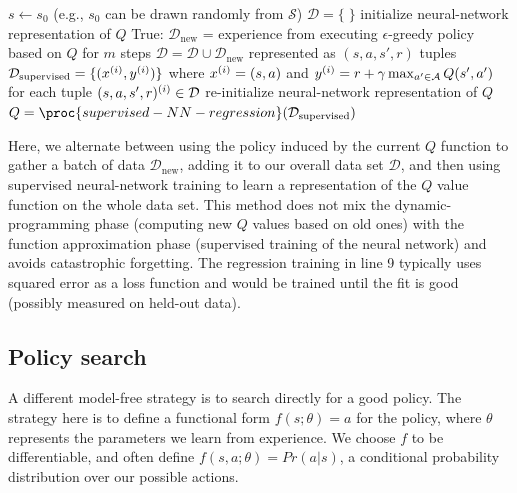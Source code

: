 \begin{codebox}
  \li $s \gets s_0$ \Comment (e.g., $s_0$ can be drawn randomly from $\mathcal{S}$)
  \li $\mathcal{D} = \{\;\}$
  \li initialize neural-network representation of $Q$
  \li \While True: \Do
  \li  $\mathcal{D}_\text{new}$ = experience from executing $\epsilon$-greedy policy based
  on $Q$ for $m$ steps
  \li $\mathcal{D} = \mathcal{D} \cup \mathcal{D}_\text{new}$ represented
  as $(s, a, s', r)$ tuples
  \li $\mathcal{D}_\text{supervised} = \{(x^{(i)}, y^{(i)})\}$  where $x^{(i)} =
    (s, a)$ and $y^{(i)} = r + \gamma \max_{a' \in \mathcal{A}} Q(s', a')$
  \li \;\;\;for each tuple $(s, a, s', r)^{(i)} \in \mathcal{D}$
  \li re-initialize neural-network representation of $Q$
  \li $Q = \proc{supervised-NN-regression}(\mathcal{D}_\text{supervised})$
  \End
\end{codebox}

Here, we alternate between using the policy induced by the current $Q$
function to gather a batch of data $\mathcal{D}_\text{new}$, adding it
to our overall data set $\mathcal{D}$, and then using supervised
neural-network training to learn a representation of the $Q$ value
function on the whole data set.  This method does not mix the
dynamic-programming phase (computing new $Q$ values based on old ones)
with the function approximation phase (supervised training of the
neural network) and avoids catastrophic forgetting.  The regression
training in line 9 typically uses squared error as a loss function and
would be trained until the fit is good (possibly measured on held-out
data).




\subsection{Policy search}
\label{sec-rl_policy_search}

A different model-free strategy is to search directly for a good
policy.  The strategy here is to define a functional form $f(s;\theta)
  = a$ for the policy, where $\theta$ represents the parameters we learn
from experience. We choose $f$ to be differentiable, and often define
$f(s, a;\theta) = Pr(a|s)$, a conditional probability distribution over
our possible actions.

